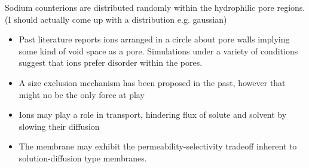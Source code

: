 \documentclass{article}
\begin{document}
	Sodium counterions are distributed randomly within the hydrophilic pore regions. (I should actually come up with a distribution e.g. gaussian)
	\begin{itemize}
		\item Past literature reports ions arranged in a circle about pore walls implying some kind of void space as a pore. Simulations under a variety of conditions suggest that ions prefer disorder within the pores. 
		\item A size exclusion mechanism has been proposed in the past, however that might no be the only force at play
		\item Ions may play a role in transport, hindering flux of solute and solvent by slowing their diffusion
		\item The membrane may exhibit the permeability-selectivity tradeoff inherent to solution-diffusion type membranes. 
        \end{itemize}	
\end{document}
